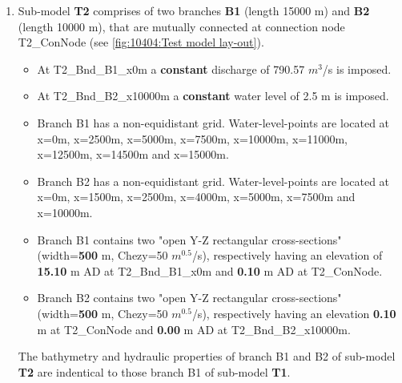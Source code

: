 \begin{enumerate}
	\item Sub-model \textbf{\textcolor[rgb]{1,0,0}{T2}} comprises of two branches \textbf{B1} (length 15000 m) and \textbf{B2} (length 10000 m), that are mutually connected at connection node T2\_ConNode (see \autoref{fig:10404:Test model lay-out}). 
		\begin{itemize}
			\item At T2\_Bnd\_B1\_x0m a \textbf{constant} discharge of 790.57 $m^3$/s is imposed.
			\item At T2\_Bnd\_B2\_x10000m a \textbf{constant} water level of 2.5 m is imposed.
			\item Branch B1 has a non-equidistant grid. Water-level-points are located at x=0m, x=2500m, x=5000m, x=7500m, x=10000m, x=11000m, x=12500m, x=14500m and x=15000m.
			\item Branch B2 has a non-equidistant grid. Water-level-points are located at x=0m, x=1500m, x=2500m, x=4000m, x=5000m, x=7500m and x=10000m.
			\item Branch B1 contains two "open Y-Z rectangular cross-sections" (width=\textbf{\textcolor[rgb]{0.5,0,0.15}{500}} m, Chezy=50 $m^{0.5}$/s), respectively having an elevation of \textbf{15.10} m AD at T2\_Bnd\_B1\_x0m and \textbf{0.10} m AD at T2\_ConNode.
			\item Branch B2 contains two "open Y-Z rectangular cross-sections" (width=\textbf{\textcolor[rgb]{0.5,0,0.15}{500}} m, Chezy=50 $m^{0.5}$/s), respectively having an elevation \textbf{0.10} m at T2\_ConNode and \textbf{0.00} m AD at \newline T2\_Bnd\_B2\_x10000m.
		\end{itemize} 
		
		\Note The bathymetry and hydraulic properties of branch B1 and B2 of sub-model \textbf{\textcolor[rgb]{1,0,0}{T2}} are indentical to those branch B1 of sub-model \textbf{\textcolor[rgb]{1,0,0}{T1}}. \\
	

\end{enumerate}
